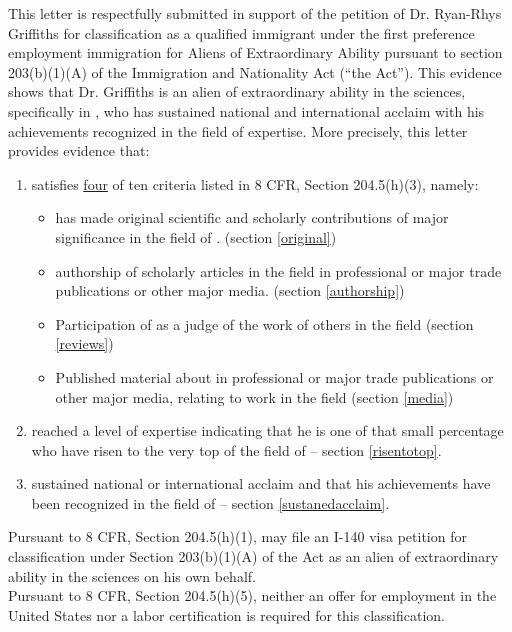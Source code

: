 \documentclass[11pt]{article}
\begin{document}
This letter is respectfully submitted in support of the petition of Dr. Ryan-Rhys Griffiths for classification as a qualified immigrant under the first preference employment immigration for Aliens of Extraordinary Ability pursuant to section 203(b)(1)(A) of the Immigration and Nationality Act (“the Act”). This evidence shows that Dr. Griffiths is an alien of extraordinary ability in the sciences, specifically in \underline{\fie{}}, who has sustained national and international acclaim with his achievements recognized in the field of expertise. More precisely, this letter provides evidence that:
\begin{enumerate}
 \item \dr satisfies \underline{four} of ten criteria listed in 8
CFR, Section 204.5(h)(3), namely:
\begin{itemize}
 \item \dr has made original scientific and scholarly contributions of major significance in the field of \fie{}. (section \ref{original})
 \item \drs authorship of scholarly articles in the field in professional or major trade publications or other major media. (section \ref{authorship})
 \item Participation of \dr as a judge of the work of others in the field (section \ref{reviews})
\item Published material about \dr in professional or major trade publications or other major media, relating to \drs work in the field (section \ref{media})
\end{itemize}
 \item \dr reached a level of expertise indicating that he is one of that small percentage who have risen to the very top of the field of \fie{} -- section \ref{risentotop}.
 \item \dr sustained national or international acclaim and that his achievements have been recognized in the field of \fie{} -- section \ref{sustanedacclaim}.
\end{enumerate}


Pursuant to 8 CFR, Section 204.5(h)(1), \dr may file an I-140 visa petition for classification under Section 203(b)(1)(A) of the Act as an alien of extraordinary ability in the sciences on his own behalf.\\

Pursuant to 8 CFR, Section 204.5(h)(5), neither an offer for employment in the United States nor a labor certification is required for this classification.
\end{document}
